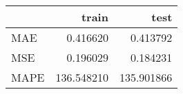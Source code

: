 \begin{tabular}{lrr}
\toprule
{} &       train &        test \\
\midrule
MAE  &    0.416620 &    0.413792 \\
MSE  &    0.196029 &    0.184231 \\
MAPE &  136.548210 &  135.901866 \\
\bottomrule
\end{tabular}
